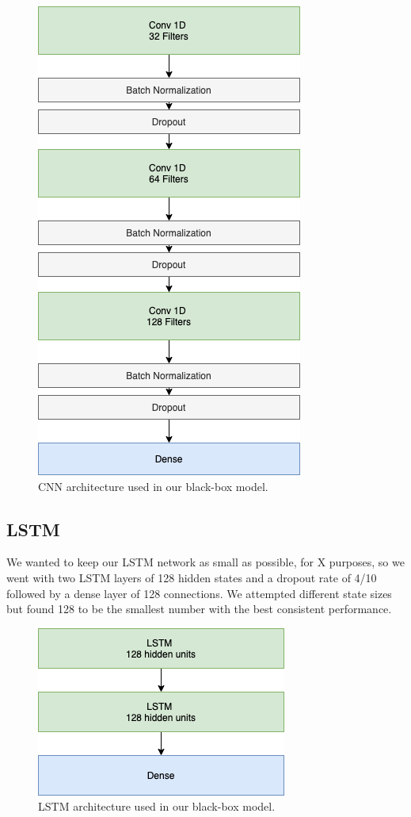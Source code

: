 \documentclass{turabian-thesis}
\begin{document}
\begin{figure}[h!]
   \begin{center}
      \includegraphics[scale=0.6]{../media/cnn_model.png}
   \end{center}
   \caption{CNN architecture used in our black-box model.}  
    \label{fig:cnn_model}
\end{figure}

\subsection{LSTM}
We wanted to keep our LSTM network as small as possible, for X purposes, so we went with two LSTM layers of 128 hidden states and a dropout rate of 4/10  followed by a dense layer of 128 connections. We attempted different state sizes but found 128 to be the smallest number with the best consistent performance.

\begin{figure}[h!]
   \begin{center}
      \includegraphics[scale=0.6]{../media/lstm_model.png}
   \end{center}
   \caption{LSTM architecture used in our black-box model.}
   \label{fig:lstm_model}
\end{figure}
\end{document}
